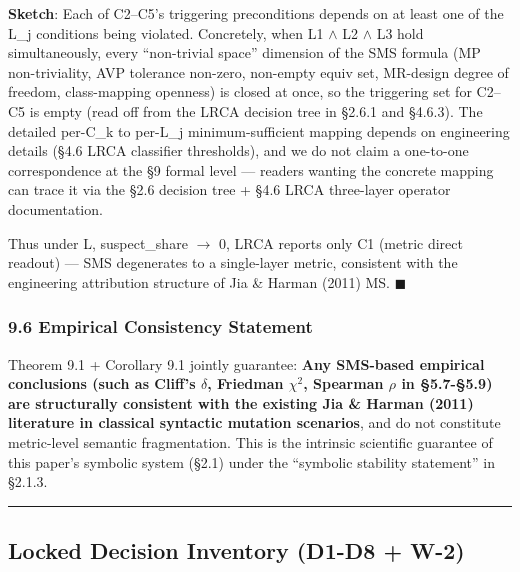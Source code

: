 \documentclass[review,12pt,authoryear]{elsarticle}
\begin{document}
\textbf{Sketch}: Each of C2--C5's triggering preconditions depends on at
least one of the L\_j conditions being violated. Concretely, when L1 $\wedge$
L2 $\wedge$ L3 hold simultaneously, every ``non-trivial space'' dimension of
the SMS formula (MP non-triviality, AVP tolerance non-zero, non-empty
equiv set, MR-design degree of freedom, class-mapping openness) is
closed at once, so the triggering set for C2--C5 is empty (read off from
the LRCA decision tree in §2.6.1 and §4.6.3). The detailed per-C\_k to
per-L\_j minimum-sufficient mapping depends on engineering details (§4.6
LRCA classifier thresholds), and we do not claim a one-to-one
correspondence at the §9 formal level --- readers wanting the concrete
mapping can trace it via the §2.6 decision tree + §4.6 LRCA three-layer
operator documentation.

Thus under L, suspect\_share $\to$ 0, LRCA reports only C1 (metric direct
readout) --- SMS degenerates to a single-layer metric, consistent with
the engineering attribution structure of Jia \& Harman (2011) MS. $\blacksquare$

\subsubsection{9.6 Empirical Consistency
Statement}\label{empirical-consistency-statement}

Theorem 9.1 + Corollary 9.1 jointly guarantee: \textbf{Any SMS-based
empirical conclusions (such as Cliff's $\delta$, Friedman $\chi$$^{2}$, Spearman $\rho$ in
§5.7-§5.9) are structurally consistent with the existing Jia \& Harman
(2011) literature in classical syntactic mutation scenarios}, and do not
constitute metric-level semantic fragmentation. This is the intrinsic
scientific guarantee of this paper's symbolic system (§2.1) under the
``symbolic stability statement'' in §2.1.3.

\begin{center}\rule{0.5\linewidth}{0.5pt}\end{center}

\subsection{Locked Decision Inventory (D1-D8 +
W-2)}\label{locked-decision-inventory-d1-d8-w-2}
\end{document}

